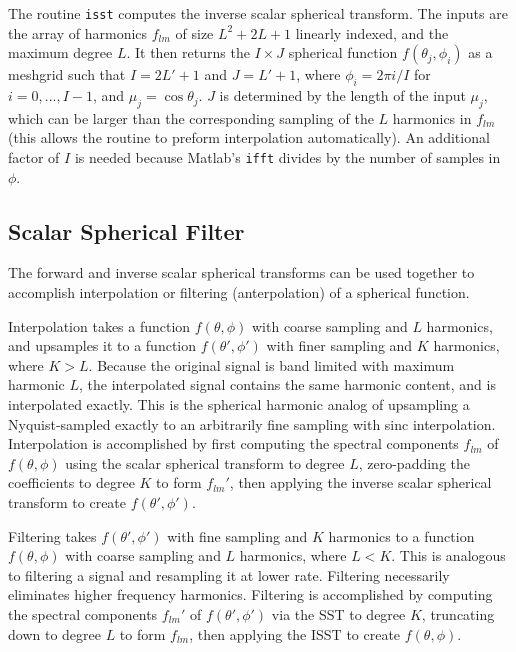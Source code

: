 The routine \texttt{isst} computes the inverse scalar spherical transform.  The inputs are the array of harmonics $f_{lm}$ of size $L^2 + 2L + 1$ linearly indexed, and the maximum degree $L$. It then returns the $I \times J$ spherical function $f(\theta_j,\phi_i)$ as a meshgrid such that $I = 2L'+1$ and $J = L' + 1$, where $\phi_i = 2\pi i/ I $ for $ i = 0,...,I-1$, and $\mu_j = \cos\theta_j$.  $J$ is determined by the length of the input $\mu_j$, which can be larger than the corresponding sampling of the $L$ harmonics in $f_{lm}$ (this allows the routine to preform interpolation automatically). An additional factor of $I$ is needed because Matlab's \texttt{ifft} divides by the number of samples in $\phi$.  

{\footnotesize
{}
}

\clearpage

\subsection{Scalar Spherical Filter}

The forward and inverse scalar spherical transforms can be used together to accomplish interpolation or filtering (anterpolation) of a spherical function.  

Interpolation takes a function $f(\theta,\phi)$ with coarse sampling and $L$ harmonics, and upsamples it to a function $f(\theta',\phi')$ with finer sampling and $K$ harmonics, where $K > L$.  Because the original signal is band limited with maximum harmonic $L$, the interpolated signal contains the same harmonic content, and is interpolated exactly. This is the spherical harmonic analog of upsampling a Nyquist-sampled exactly to an arbitrarily fine sampling with sinc interpolation.  Interpolation is accomplished by first computing the spectral components $f_{lm}$ of $f(\theta,\phi)$ using the scalar spherical transform to degree $L$, zero-padding the coefficients to degree $K$ to form $f_{lm}'$, then applying the inverse scalar spherical transform to create $f(\theta',\phi')$.

Filtering takes $f(\theta',\phi')$ with fine sampling and $K$ harmonics to a function $f(\theta,\phi)$ with coarse sampling and $L$ harmonics, where $L < K$.  This is analogous to filtering a signal and resampling it at lower rate.  Filtering necessarily eliminates higher frequency harmonics.  Filtering is accomplished by computing the spectral components $f_{lm}'$ of $f(\theta',\phi')$ via the SST to degree $K$, truncating down to degree $L$ to form $f_{lm}$, then applying the ISST to create $f(\theta,\phi)$.

